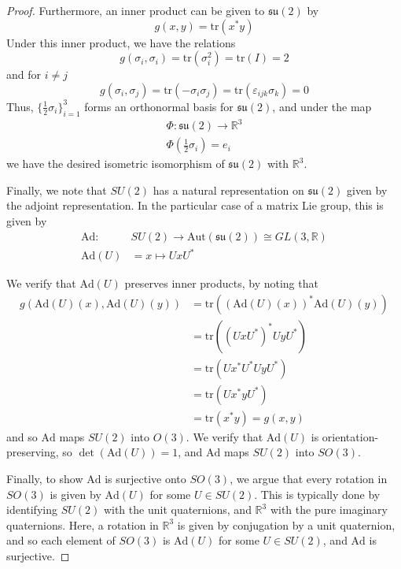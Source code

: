 \documentclass[fontsize=11pt]{scrartcl} %
\numberwithin{equation}{section} %
\numberwithin{figure}{section} %
\numberwithin{table}{section} %
\newcommand{\R}{\mathbb{R}}
\newcommand{\tr}{\text{tr}}
\newcommand{\Ad}{\text{Ad}}
\newcommand{\Aut}{\text{Aut}}
\begin{document}
\begin{proof}
    Furthermore, an inner product can be given to $\mathfrak{su}(2)$ by
    \[
    g(x,y) = \tr(x^*y)
    \]
    Under this inner product, we have the relations
    \[
        g(\sigma_i,\sigma_i) = \tr(\sigma_i^2) = \tr(I) = 2
    \]
    and for $i\neq j$
    \[
        g(\sigma_i,\sigma_j) = \tr(-\sigma_i\sigma_j) =
        \tr(\varepsilon_{ijk}\sigma_k) = 0
    \]
    Thus, $\{\frac{1}{2}\sigma_i\}_{i=1}^3$ forms an orthonormal basis for
    $\mathfrak{su}(2)$, and under the map
    \[
\begin{aligned}
    \Phi:\mathfrak{su}(2)\to \R^3\\
    \Phi(\frac{1}{2}\sigma_i) = e_i
\end{aligned}
    \]
    we have the desired isometric isomorphism of $\mathfrak{su}(2)$ with $\R^3$.

    Finally, we note that $SU(2)$ has a natural representation on
    $\mathfrak{su}(2)$ given by the adjoint representation. In the particular
    case of a matrix Lie group, this is given by
    \[
        \begin{aligned}
            \Ad:&SU(2)\to \Aut(\mathfrak{su}(2))\cong GL(3,\R)\\
            \Ad(U) &= x\mapsto UxU^*
        \end{aligned}
    \]
    
    We verify that $\Ad(U)$ preserves inner products, by noting that
    \[
        \begin{aligned}
            g(\Ad(U)(x),\Ad(U)(y)) &= \tr((\Ad(U)(x))^*\Ad(U)(y))\\
            &= \tr((UxU^*)^*UyU^*)\\
            &= \tr(Ux^*U^*UyU^*)\\
            &= \tr(Ux^*yU^*)\\
            &= \tr(x^*y) = g(x,y)
        \end{aligned}
    \]
    and so $\Ad$ maps $SU(2)$ into $O(3)$. We verify that $\Ad(U)$ is
    orientation-preserving, so $\det(\Ad(U)) = 1$, and $\Ad$ maps $SU(2)$ into
    $SO(3)$.

    Finally, to show $\Ad$ is surjective onto $SO(3)$, we argue that every
    rotation in $SO(3)$ is given by $\Ad(U)$ for some $U\in SU(2)$. This is
    typically done by identifying $SU(2)$ with the unit quaternions, and $\R^3$
    with the pure imaginary quaternions. Here, a rotation in $\R^3$ is given by
    conjugation by a unit quaternion, and so each element of $SO(3)$ is
    $\Ad(U)$ for some $U\in SU(2)$, and $\Ad$ is surjective.

\end{proof}
\end{document}
